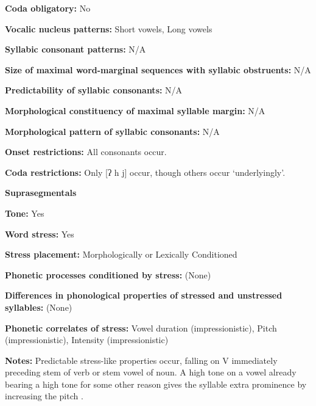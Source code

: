 \textbf{Coda obligatory:} No



\textbf{Vocalic nucleus patterns:} Short vowels, Long vowels



\textbf{Syllabic consonant patterns:} N/A



\textbf{Size of maximal word{}-marginal sequences with syllabic obstruents:} N/A



\textbf{Predictability of syllabic consonants:} N/A



\textbf{Morphological constituency of maximal syllable margin:} N/A



\textbf{Morphological pattern of syllabic consonants:} N/A



\textbf{Onset restrictions:} All consonants occur.



\textbf{Coda restrictions:} Only [ʔ h j] occur, though others occur ‘underlyingly’.



\textbf{Suprasegmentals}



\textbf{Tone:} Yes



\textbf{Word stress:} Yes



\textbf{Stress placement:} Morphologically or Lexically Conditioned



\textbf{Phonetic processes conditioned by stress:} (None)



\textbf{Differences in phonological properties of stressed and unstressed syllables:} (None)



\textbf{Phonetic correlates of stress:} Vowel duration (impressionistic), Pitch (impressionistic), Intensity (impressionistic)



\textbf{Notes:} Predictable stress-like properties occur, falling on V immediately preceding stem of verb or stem vowel of noun. A high tone on a vowel already bearing a high tone for some other reason gives the syllable extra prominence by increasing the pitch \citep[362]{Rice2005}.



